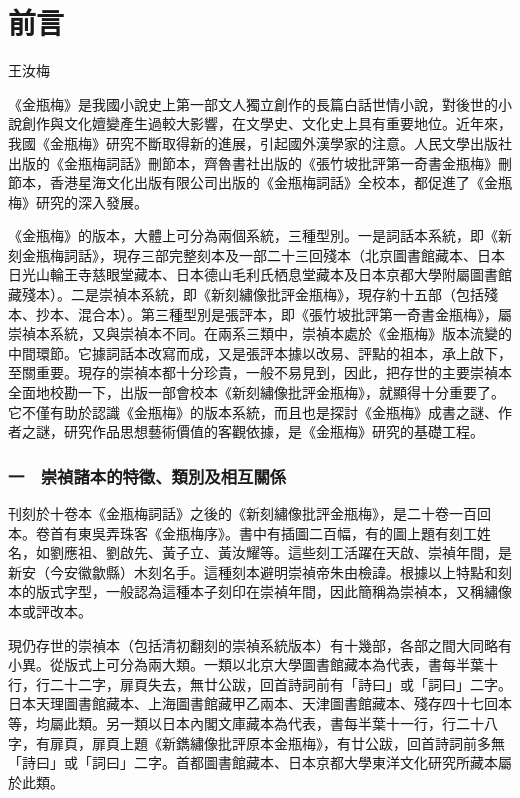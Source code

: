 \chapter*{前言}

\begin{declareqianyan}
王汝梅\ \ \ \ \ \ \ \ 
\end{declareqianyan}	

《金瓶梅》是我國小說史上第一部文人獨立創作的長篇白話世情小說，對後世的小說創作與文化嬗變產生過較大影響，在文學史、文化史上具有重要地位。近年來，我國《金瓶梅》研究不斷取得新的進展，引起國外漢學家的注意。人民文學出版社出版的《金瓶梅詞話》刪節本，齊魯書社出版的《張竹坡批評第一奇書金瓶梅》刪節本，香港星海文化出版有限公司出版的《金瓶梅詞話》全校本，都促進了《金瓶梅》研究的深入發展。

《金瓶梅》的版本，大體上可分為兩個系統，三種型別。一是詞話本系統，即《新刻金瓶梅詞話》，現存三部完整刻本及一部二十三回殘本（北京圖書館藏本、日本日光山輪王寺慈眼堂藏本、日本德山毛利氏栖息堂藏本及日本京都大學附屬圖書館藏殘本）。二是崇禎本系統，即《新刻繡像批評金瓶梅》，現存約十五部（包括殘本、抄本、混合本）。第三種型別是張評本，即《張竹坡批評第一奇書金瓶梅》，屬崇禎本系統，又與崇禎本不同。在兩系三類中，崇禎本處於《金瓶梅》版本流變的中間環節。它據詞話本改寫而成，又是張評本據以改易、評點的祖本，承上啟下，至關重要。現存的崇禎本都十分珍貴，一般不易見到，因此，把存世的主要崇禎本全面地校勘一下，出版一部會校本《新刻繡像批評金瓶梅》，就顯得十分重要了。它不僅有助於認識《金瓶梅》的版本系統，而且也是探討《金瓶梅》成書之謎、作者之謎，研究作品思想藝術價值的客觀依據，是《金瓶梅》研究的基礎工程。

\subsection*{一　崇禎諸本的特徵、類別及相互關係}

刊刻於十卷本《金瓶梅詞話》之後的《新刻繡像批評金瓶梅》，是二十卷一百回本。卷首有東吳弄珠客《金瓶梅序》。書中有插圖二百幅，有的圖上題有刻工姓名，如劉應祖、劉啟先、黃子立、黃汝耀等。這些刻工活躍在天啟、崇禎年間，是新安（今安徽歙縣）木刻名手。這種刻本避明崇禎帝朱由檢諱。根據以上特點和刻本的版式字型，一般認為這種本子刻印在崇禎年間，因此簡稱為崇禎本，又稱繡像本或評改本。

現仍存世的崇禎本（包括清初翻刻的崇禎系統版本）有十幾部，各部之間大同略有小異。從版式上可分為兩大類。一類以北京大學圖書館藏本為代表，書每半葉十行，行二十二字，扉頁失去，無廿公跋，回首詩詞前有「詩曰」或「詞曰」二字。日本天理圖書館藏本、上海圖書館藏甲乙兩本、天津圖書館藏本、殘存四十七回本等，均屬此類。另一類以日本內閣文庫藏本為代表，書每半葉十一行，行二十八字，有扉頁，扉頁上題《新鐫繡像批評原本金瓶梅》，有廿公跋，回首詩詞前多無 「詩曰」或「詞曰」二字。首都圖書館藏本、日本京都大學東洋文化研究所藏本屬於此類。

